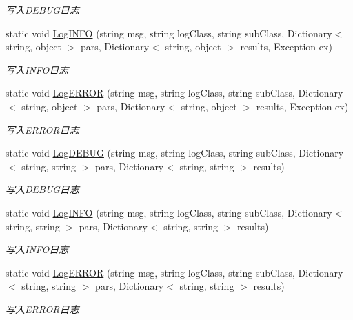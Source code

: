 \begin{DoxyCompactItemize}
\begin{DoxyCompactList}\small\item\em 写入\-D\-E\-B\-U\-G日志 \end{DoxyCompactList}\item 
static void \hyperlink{class_krs_1_1_base_1_1_logs_1_1_log_message_helper_abc4e2ce94da5039126ee3cef5f400e45}{Log\-I\-N\-F\-O} (string msg, string log\-Class, string sub\-Class, Dictionary$<$ string, object $>$ pars, Dictionary$<$ string, object $>$ results, Exception ex)
\begin{DoxyCompactList}\small\item\em 写入\-I\-N\-F\-O日志 \end{DoxyCompactList}\item 
static void \hyperlink{class_krs_1_1_base_1_1_logs_1_1_log_message_helper_aa99965abc19b71839ad84270b840f798}{Log\-E\-R\-R\-O\-R} (string msg, string log\-Class, string sub\-Class, Dictionary$<$ string, object $>$ pars, Dictionary$<$ string, object $>$ results, Exception ex)
\begin{DoxyCompactList}\small\item\em 写入\-E\-R\-R\-O\-R日志 \end{DoxyCompactList}\item 
static void \hyperlink{class_krs_1_1_base_1_1_logs_1_1_log_message_helper_af054faa7b1cd9331f13456582a290a43}{Log\-D\-E\-B\-U\-G} (string msg, string log\-Class, string sub\-Class, Dictionary$<$ string, string $>$ pars, Dictionary$<$ string, string $>$ results)
\begin{DoxyCompactList}\small\item\em 写入\-D\-E\-B\-U\-G日志 \end{DoxyCompactList}\item 
static void \hyperlink{class_krs_1_1_base_1_1_logs_1_1_log_message_helper_aa48801ce0e7b2ac3d5b1622c4552c2b6}{Log\-I\-N\-F\-O} (string msg, string log\-Class, string sub\-Class, Dictionary$<$ string, string $>$ pars, Dictionary$<$ string, string $>$ results)
\begin{DoxyCompactList}\small\item\em 写入\-I\-N\-F\-O日志 \end{DoxyCompactList}\item 
static void \hyperlink{class_krs_1_1_base_1_1_logs_1_1_log_message_helper_acb69e510fe7d23c3f916e7bf625f72b1}{Log\-E\-R\-R\-O\-R} (string msg, string log\-Class, string sub\-Class, Dictionary$<$ string, string $>$ pars, Dictionary$<$ string, string $>$ results)
\begin{DoxyCompactList}\small\item\em 写入\-E\-R\-R\-O\-R日志 \end{DoxyCompactList}\item 

\end{DoxyCompactItemize}
